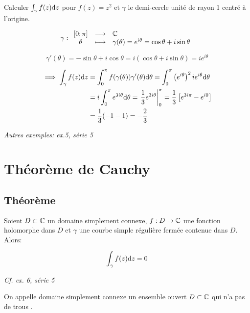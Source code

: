 \begin{example}
    Calculer $\int_\gamma f(z) \mathrm{d}z$ pour $f(z) = z^2$ et $\gamma$ le demi-cercle unité de rayon 1 centré à l'origine.
    
    \[
    \gamma:
    \begin{array}{ccl}
    [0;\pi] & \longrightarrow & \mathbb{C} \\
    \theta & \longmapsto & \gamma(\theta) = e^{i\theta} = \cos \theta + i \sin \theta
    \end{array}
    \]
    
    \[
    \gamma'(\theta) = -\sin \theta + i \cos \theta = i(\cos \theta + i \sin \theta) = i e^{i\theta}
    \]
    
    \begin{align*}
    \implies \int_\gamma f(z) \mathrm{d}z &= \int_0^\pi f(\gamma(\theta)) \gamma'(\theta) \mathrm{d}\theta = \int_0^\pi \left(e^{i\theta}\right)^2 i e^{i\theta} \mathrm{d}\theta
    \\&=
    i \int_0^\pi e^{3i\theta} \mathrm{d}\theta = \left.\frac{1}{3} e^{3i\theta} \right|_0^\pi = \frac{1}{3} \left[e^{3i\pi} - e^{i0}\right]
    \\&=
    \frac{1}{3} (-1-1) = -\frac{2}{3}
    \end{align*}
    
    \textit{Autres exemples: ex.5, série 5}
\end{example}


\section{Théorème de Cauchy}

\subsection{Théorème}

\begin{theorem}[10.2, p.73]
    Soient $D \subset \mathbb{C}$ un domaine simplement connexe, $f: D \rightarrow \mathbb{C}$ une fonction holomorphe dans $D$ et $\gamma$ une courbe simple régulière fermée contenue dans $D$.
    Alors:
    
    \[\int_\gamma f(z) \mathrm{d}z = 0\]
    
    \textit{Cf. ex. 6, série 5}
\end{theorem}

\begin{terminology}
    On appelle domaine simplement connexe un ensemble ouvert $D \subset \mathbb{C}$ qui \og n'a pas de trous \fg{}.
\end{terminology}

